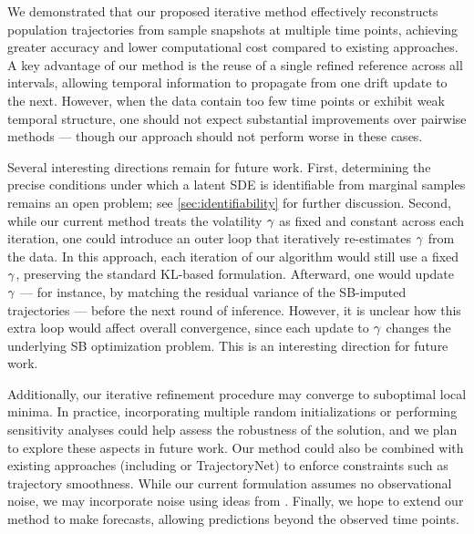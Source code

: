 We demonstrated that our proposed iterative method effectively reconstructs population trajectories from sample snapshots at multiple time points, achieving greater accuracy and lower computational cost compared to existing approaches. A key advantage of our method is the reuse of a single refined reference across all intervals, allowing temporal information to propagate from one drift update to the next. However, when the data contain too few time points or exhibit weak temporal structure, one should not expect substantial improvements over pairwise methods --- though our approach should not perform worse in these cases.

Several interesting directions remain for future work. First, determining the precise conditions under which a latent SDE is identifiable from marginal samples remains an open problem; see \cref{sec:identifiability} for further discussion. Second, while our current method treats the volatility $\gamma$ as fixed and constant across each iteration, one could introduce an outer loop that iteratively re-estimates $\gamma$ from the data. In this approach, each iteration of our algorithm would still use a fixed $\gamma$, preserving the standard KL-based formulation. Afterward, one would update $\gamma$ --- for instance, by matching the residual variance of the SB-imputed trajectories --- before the next round of inference. However, it is unclear how this extra loop would affect overall convergence, since each update to $\gamma$ changes the underlying SB optimization problem. This is an interesting direction for future work.

Additionally, our iterative refinement procedure may converge to suboptimal local minima. In practice, incorporating multiple random initializations or performing sensitivity analyses could help assess the robustness of the solution, and we plan to explore these aspects in future work. Our method could also be combined with existing approaches (including \dmsbname{} or TrajectoryNet) to enforce constraints such as trajectory smoothness. While our current formulation assumes no observational noise, we may incorporate noise using ideas from \citet{Wang2023}. Finally, we hope to extend our method to make forecasts, allowing predictions beyond the observed time points.